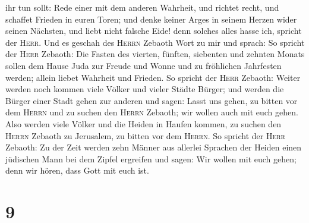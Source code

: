 ihr tun sollt: Rede einer mit dem anderen Wahrheit, und richtet recht,
und schaffet Frieden in euren Toren;  und denke keiner
Arges in seinem Herzen wider seinen Nächsten, und liebt nicht falsche
Eide! denn solches alles hasse ich, spricht der \textsc{Herr}.
 Und es geschah des \textsc{Herrn} Zebaoth Wort zu mir
und sprach:  So spricht der \textsc{Herr} Zebaoth: Die
Fasten des vierten, fünften, siebenten und zehnten Monats sollen dem
Hause Juda zur Freude und Wonne und zu fröhlichen Jahrfesten werden;
allein liebet Wahrheit und Frieden.  So spricht der
\textsc{Herr} Zebaoth: Weiter werden noch kommen viele Völker und vieler
Städte Bürger;  und werden die Bürger einer Stadt gehen
zur anderen und sagen: Lasst uns gehen, zu bitten vor dem \textsc{Herrn}
und zu suchen den \textsc{Herrn} Zebaoth; wir wollen auch mit euch
gehen.  Also werden viele Völker und die Heiden in Haufen
kommen, zu suchen den \textsc{Herrn} Zebaoth zu Jerusalem, zu bitten vor
dem \textsc{Herrn}.  So spricht der \textsc{Herr}
Zebaoth: Zu der Zeit werden zehn Männer aus allerlei Sprachen der Heiden
einen jüdischen Mann bei dem Zipfel ergreifen und sagen: Wir wollen mit
euch gehen; denn wir hören, dass Gott mit euch ist.

\hypertarget{section-8}{%
\section{9}\label{section-8}}

